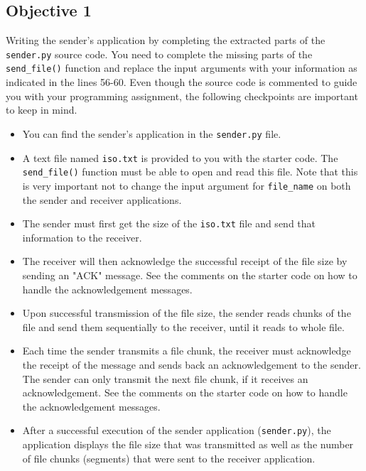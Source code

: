 \documentclass[11pt]{article}
\begin{document}

\subsection{Objective 1}
\label{subsec:obj1}
Writing the sender's application by completing the extracted parts of the \texttt{sender.py} source code. You need to complete the missing parts of the \texttt{send\_file()} function and replace the input arguments with your information as indicated in the lines 56-60. Even though the source code is commented to guide you with your programming assignment, the following checkpoints are important to keep in mind.
\begin{itemize}
    \item You can find the sender's application in the \texttt{sender.py} file.
    \item A text file named \texttt{iso.txt} is provided to you with the starter code. The \texttt{send\_file()} function must be able to open and read this file. Note that this is very important not to change the input argument for \texttt{file\_name} on both the sender and receiver applications.
    \item The sender must first get the size of the \texttt{iso.txt} file and send that information to the receiver.
    \item The receiver will then acknowledge the successful receipt of the file size by sending an "ACK" message. See the comments on the starter code on how to handle the acknowledgement messages.
    \item Upon successful transmission of the file size, the sender reads chunks of the file and send them sequentially to the receiver, until it reads to whole file.
    \item Each time the sender transmits a file chunk, the receiver must acknowledge the receipt of the message and sends back an acknowledgement to the sender. The sender can only transmit the next file chunk, if it receives an acknowledgement. See the comments on the starter code on how to handle the acknowledgement messages.
    \item After a successful execution of the sender application (\texttt{sender.py}), the application displays the file size that was transmitted as well as the number of file chunks (segments) that were sent to the receiver application.
\end{itemize}
\end{document}
